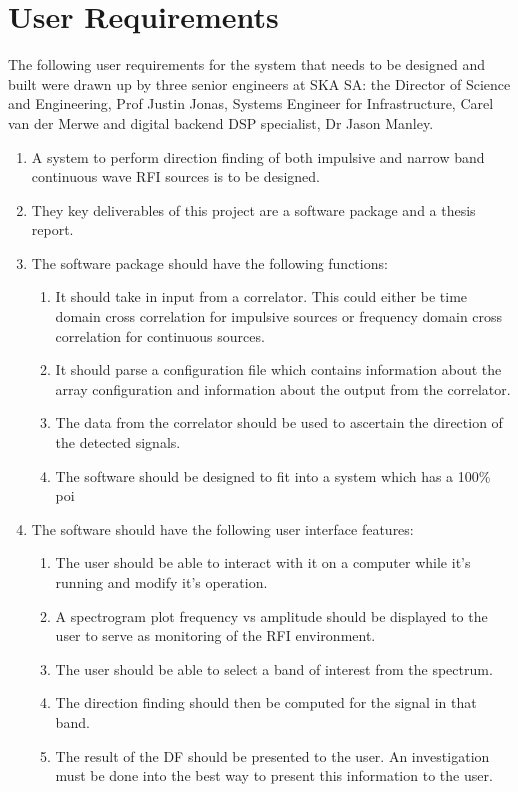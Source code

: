 \section{User Requirements}

The following user requirements for the system that needs to be designed and built were drawn up by three senior engineers at SKA SA: the Director of Science and Engineering, Prof Justin Jonas, Systems Engineer for Infrastructure, Carel van der Merwe and digital backend DSP specialist, Dr Jason Manley. 
\begin{enumerate}
  \item A system to perform direction finding of both impulsive and narrow band continuous wave RFI sources is to be designed.
  \item They key deliverables of this project are a software package and a thesis report.
  \item The software package should have the following functions:
    \begin{enumerate}
      \item It should take in input from a correlator. This could either be time domain cross correlation for impulsive sources or frequency domain cross correlation for continuous sources. 
      \item It should parse a configuration file which contains information about the array configuration and information about the output from the correlator.
      \item The data from the correlator should be used to ascertain the direction of the detected signals.
      \item The software should be designed to fit into a system which has a 100\% \gls{poi}
    \end{enumerate}
  \item The software should have the following user interface features:
    \begin{enumerate}
      \item The user should be able to interact with it on a computer while it's running and modify it's operation.
      \item A spectrogram plot frequency vs amplitude should be displayed to the user to serve as monitoring of the RFI environment.
      \item The user should be able to select a band of interest from the spectrum.
      \item The direction finding should then be computed for the signal in that band.
      \item The result of the DF should be presented to the user. An investigation must be done into the best way to present this information to the user.

\end{enumerate}
\end{enumerate}
